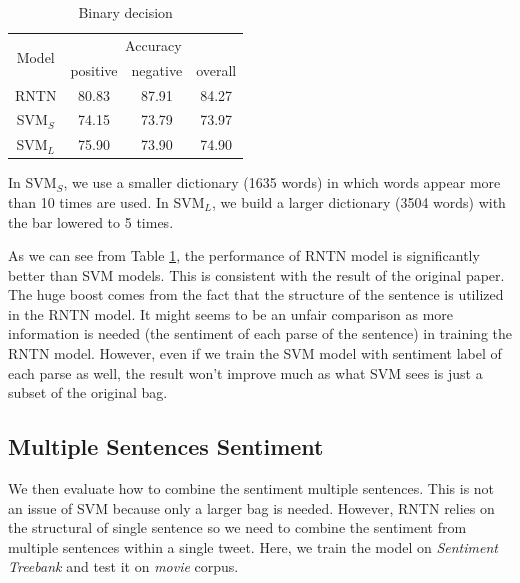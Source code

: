 \begin{table}[H]
  \begin{center}
    \begin{tabular}{cccc}\hline
      \multirow{2}{*}{Model} 
      & \multicolumn{3}{c}{Accuracy} \\\cline{2-4}
    & positive & negative & overall \\ \hline
    RNTN  & 80.83      &   87.91   &  84.27      \\ 
    SVM$_S$  & 74.15      &  73.79    &    73.97     \\ 
    SVM$_L$  & 75.90      & 73.90         &   74.90      \\ \hline
    \end{tabular}
    \end{center}
    \caption{\label{exp_1} Binary decision}
\end{table}

In SVM$_S$, we use a smaller dictionary (1635 words) in which words appear more than 10 times are used. In SVM$_L$, we build a larger dictionary (3504 words) with the bar lowered to 5 times. 

As we can see from Table \ref{exp_1}, the performance of RNTN model is significantly better than SVM models. This is consistent with the result of the original paper\cite{Socher:2013}. The huge boost comes from the fact that the structure of the sentence is utilized in the RNTN model. It might seems to be an unfair comparison as more information is needed (the sentiment of each parse of the sentence) in training the RNTN model. 
However, even if we train the SVM model with sentiment label of each parse as well, the result won't improve much as what SVM sees is just a subset of the original bag.  


\subsection{Multiple Sentences Sentiment}
We then evaluate how to combine the sentiment multiple sentences. This is not an issue of SVM because only a larger bag is needed. However, RNTN relies on the structural of single sentence so we need to combine the sentiment from multiple sentences within a single tweet. Here, we train the model on \textit{Sentiment Treebank} and test it on \textit{movie} corpus. 

